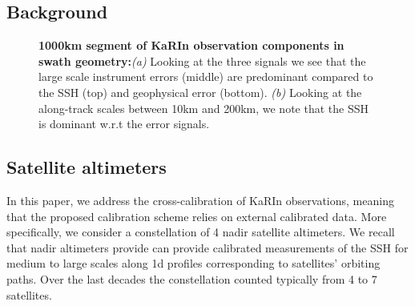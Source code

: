 \begin{bibunit}
\section{Background}
\label{sec:background}
\noindent
\begin{figure}[!t]%
   \centering
    \caption{\textbf{1000km segment of KaRIn observation components in swath geometry:}\textit{(a)} Looking at the three signals we see that the large scale instrument errors (middle) are predominant compared to the SSH (top) and geophysical error (bottom). \textit{(b)} Looking at the along-track scales between 10km and 200km, we note that the SSH is dominant w.r.t the error signals.}%
    \label{fig:filtered_swath_uncal_comp}%
\end{figure}
\subsection{Satellite altimeters}
In this paper, we address the cross-calibration of KaRIn observations, meaning that the proposed calibration scheme relies on external calibrated data. More specifically, we consider a constellation of  4 nadir satellite altimeters. We recall that nadir altimeters provide can provide calibrated measurements of the SSH for medium to large scales along 1{\sc d} profiles corresponding to satellites' orbiting paths. Over the last decades the constellation counted typically from 4 to 7 satellites.


\end{bibunit}
